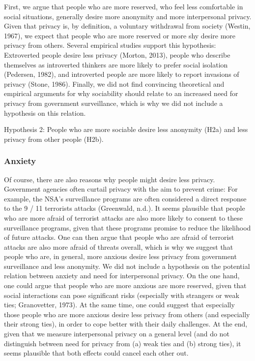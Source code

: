 \documentclass[man,floatsintext]{apa6}
\theoremstyle{definition}
\theoremstyle{definition}
\theoremstyle{definition}
\theoremstyle{remark}
\begin{document}
First, we argue that people who are more reserved, who feel less
comfortable in social situations, generally desire more anonymity and
more interpersonal privacy. Given that privacy is, by definition, a
voluntary withdrawal from society (Westin, 1967), we expect that people
who are more reserved or more shy desire more privacy from others.
Several empirical studies support this hypothesis: Extroverted people
desire less privacy (Morton, 2013), people who describe themselves as
introverted thinkers are more likely to prefer social isolation
(Pedersen, 1982), and introverted people are more likely to report
invasions of privacy (Stone, 1986). Finally, we did not find convincing
theoretical and empirical arguments for why sociability should relate to
an increased need for privacy from government surveillance, which is why
we did not include a hypothesis on this relation.

Hypothesis 2: People who are more sociable desire less anonymity (H2a)
and less privacy from other people (H2b).

\hypertarget{anxiety}{%
\subsubsection{Anxiety}\label{anxiety}}

Of course, there are also reasons why people might desire less privacy.
Government agencies often curtail privacy with the aim to prevent crime:
For example, the NSA's surveillance programs are often considered a
direct response to the 9 / 11 terrorists attacks (Greenwald, n.d.). It
seems plausible that people who are more afraid of terrorist attacks are
also more likely to consent to these surveillance programs, given that
these programs promise to reduce the likelihood of future attacks. One
can then argue that people who are afraid of terrorist attacks are also
more afraid of threats overall, which is why we suggest that people who
are, in general, more anxious desire less privacy from government
surveillance and less anonymity. We did not include a hypothesis on the
potential relation between anxiety and need for interpersonal privacy.
On the one hand, one could argue that people who are more anxious are
more reserved, given that social interactions can pose significant risks
(especially with strangers or weak ties; Granovetter, 1973). At the same
time, one could suggest that especially those people who are more
anxious desire less privacy from others (and especially their strong
ties), in order to cope better with their daily challenges. At the end,
given that we measure interpersonal privacy on a general level (and do
not distinguish between need for privacy from (a) weak ties and (b)
strong ties), it seems plausible that both effects could cancel each
other out.
\end{document}
